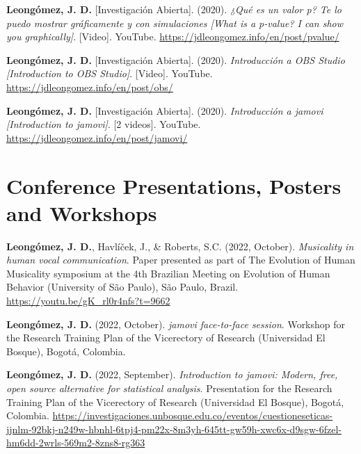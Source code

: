 \documentclass[11pt,a4paper,]{awesome-cv}
\begin{document}
\leavevmode{}%
\textbf{Leongómez, J. D.} {[}Investigación Abierta{]}. (2020).
\emph{{¿Qué es un valor p? Te lo puedo mostrar gráficamente y con
simulaciones {[}What is a p-value? I can show you graphically{]}}}.
{[}Video{]}. YouTube. \url{https://jdleongomez.info/en/post/pvalue/}

\leavevmode{}%
\textbf{Leongómez, J. D.} {[}Investigación Abierta{]}. (2020).
\emph{{Introducción a OBS Studio {[}Introduction to OBS Studio{]}}}.
{[}Video{]}. YouTube. \url{https://jdleongomez.info/en/post/obs/}

\leavevmode{}%
\textbf{Leongómez, J. D.} {[}Investigación Abierta{]}. (2020).
\emph{{Introducción a jamovi {[}Introduction to jamovi{]}}}. {[}2
videos{]}. YouTube. \url{https://jdleongomez.info/en/post/jamovi/}

\endgroup

\hypertarget{conference-presentations-posters-and-workshops}{%
\section{Conference Presentations, Posters and
Workshops}\label{conference-presentations-posters-and-workshops}}

\begingroup
\setlength{\parindent}{-0.5in}
\setlength{\leftskip}{0.5in}

\textbf{Leongómez, J. D.}, Havlíček, J., \& Roberts, S.C. (2022,
October). \emph{Musicality in human vocal communication}. Paper
presented as part of The Evolution of Human Musicality symposium at the
4th Brazilian Meeting on Evolution of Human Behavior (University of São
Paulo), São Paulo, Brazil. \url{https://youtu.be/gK_rl0r4nfs?t=9662}

\textbf{Leongómez, J. D.} (2022, October). \emph{jamovi face-to-face
session}. Workshop for the Research Training Plan of the Vicerectory of
Research (Universidad El Bosque), Bogotá, Colombia.

\textbf{Leongómez, J. D.} (2022, September). \emph{Introduction to
jamovi: Modern, free, open source alternative for statistical analysis}.
Presentation for the Research Training Plan of the Vicerectory of
Research (Universidad El Bosque), Bogotá, Colombia.
\url{https://investigaciones.unbosque.edu.co/eventos/cuestioneseticas-jjnlm-92bkj-n249w-hbnhl-6tpj4-pm22x-8m3yh-645tt-gw59h-xwc6x-d9sgw-6fzel-hm6dd-2wrls-569m2-8zns8-rg363}
\end{document}
